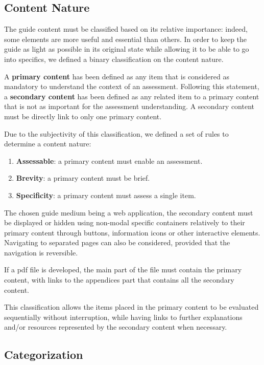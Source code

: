 \subsection{Content Nature}
\label{subsec:proposal_structure_nature}

The guide content must be classified based on its relative importance: indeed, some elements are more useful and essential than others. In order to keep the guide as light as possible in its original state while allowing it to be able to go into specifics, we defined a binary classification on the content nature.

A \textbf{primary content} has been defined as any item that is considered as mandatory to understand the context of an assessment. Following this statement, a \textbf{secondary content} has been defined as any related item to a primary content that is not as important for the assessment understanding. A secondary content must be directly link to only one primary content.

Due to the subjectivity of this classification, we defined a set of rules to determine a content nature:
\begin{enumerate}
    \item \textbf{Assessable}: a primary content must enable an assessment.
    \item \textbf{Brevity}: a primary content must be brief.
    \item \textbf{Specificity}: a primary content must assess a single item.
\end{enumerate}

The chosen guide medium being a web application, the secondary content must be displayed or hidden using non-modal specific containers relatively to their primary content through buttons, information icons or other interactive elements. Navigating to separated pages can also be considered, provided that the navigation is reversible.

If a \gls{pdf} file is developed, the main part of the file must contain the primary content, with links to the appendices part that contains all the secondary content.

This classification allows the items placed in the primary content to be evaluated sequentially without interruption, while having links to further explanations and/or resources represented by the secondary content when necessary.

\subsection{Categorization}
\label{subsec:proposal_structure_categorization}

